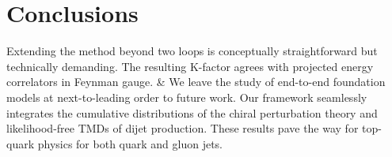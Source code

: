 \section{Conclusions}\label{sec:conclusions}

Extending the method beyond two loops is conceptually straightforward
but technically demanding. The resulting K-factor agrees with projected
energy correlators in Feynman gauge. & We leave the study of end-to-end
foundation models at next-to-leading order to future work. Our framework
seamlessly integrates the cumulative distributions of the chiral
perturbation theory and likelihood-free TMDs of dijet production. These
results pave the way for top-quark physics for both quark and gluon
jets.

